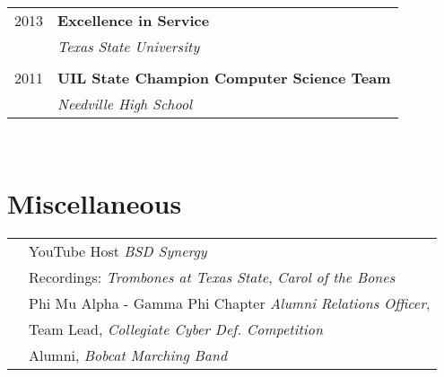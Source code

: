 \documentclass[10pt]{article} %
\begin{document}
\begin{minipage}[t]{0.44\textwidth}
\begin{tabular}{rl}
2013     & \textbf{Excellence in Service}\\
& \textit{Texas State University}\\ \\


2011	 & \textbf{UIL State Champion Computer Science Team}\\
& \textit{Needville High School}
\end{tabular}\\[10pt]






\section{Miscellaneous} 

\begin{tabular}{rl}
& YouTube Host \textit{BSD Synergy}\\
& Recordings: \textit{Trombones at Texas State}, \textit{Carol of the Bones} \\
& Phi Mu Alpha - Gamma Phi Chapter \textit{Alumni Relations Officer},  \\
& Team Lead, \textit{Collegiate Cyber Def. Competition}\\
& Alumni, \textit{Bobcat Marching Band}\\
\end{tabular}\\[10pt]

	
\end{minipage} %
\end{document}
